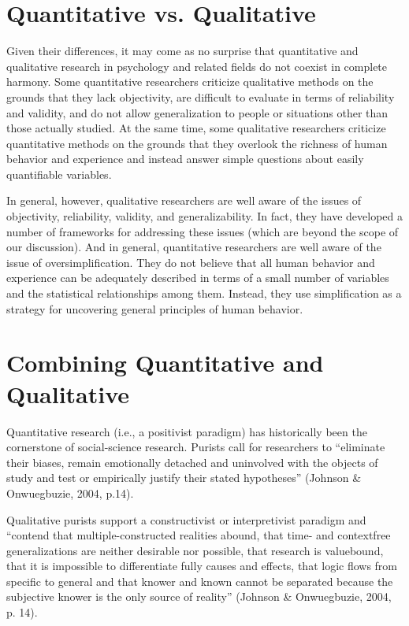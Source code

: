 \section{Quantitative vs. Qualitative}
Given their differences, it may come as no surprise that quantitative and qualitative research in psychology and related fields do not coexist in complete harmony. Some quantitative researchers criticize qualitative methods on the grounds that they lack objectivity, are difficult to evaluate in terms of reliability and validity, and do not allow generalization to people or situations other than those actually studied. At the same time, some qualitative researchers criticize quantitative methods on the grounds that they overlook the richness of human behavior and experience and instead answer simple questions about easily quantifiable variables.

In general, however, qualitative researchers are well aware of the issues of objectivity, reliability, validity, and generalizability. In fact, they have developed a number of frameworks for addressing these issues (which are beyond the scope of our discussion). And in general, quantitative researchers are well aware of the issue of oversimplification. They do not believe that all human behavior and experience can be adequately described in terms of a small number of variables and the statistical relationships among them. Instead, they use simplification as a strategy for uncovering general principles of human behavior.


\section{Combining Quantitative and Qualitative}

Quantitative research (i.e., a positivist paradigm) has historically been the
cornerstone of social-science research. Purists call for researchers to
“eliminate their biases, remain emotionally detached and uninvolved with the
objects of study and test or empirically justify their stated hypotheses”
(Johnson \& Onwuegbuzie, 2004, p.14).

Qualitative purists support a constructivist or interpretivist paradigm and
“contend that multiple-constructed realities abound, that time- and contextfree
generalizations are neither desirable nor possible, that research is valuebound,
that it is impossible to differentiate fully causes and effects, that logic
flows from specific to general and that knower and known cannot be
separated because the subjective knower is the only source of reality”
(Johnson \& Onwuegbuzie, 2004, p. 14).

